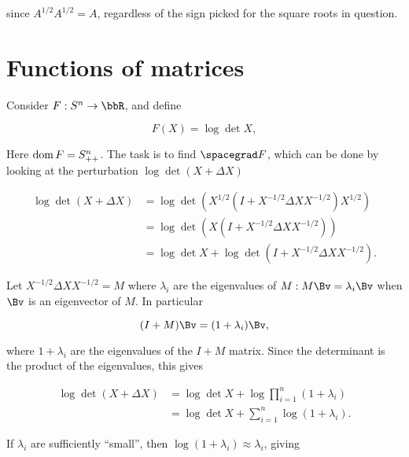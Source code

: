 since \( A^{1/2} A^{1/2} = A \), regardless of the sign picked for the square roots in question.

\section{Functions of matrices}

Consider \( F : S^n \rightarrow \bbR \), and define

\begin{dmath}\label{eqn:convexOptimizationLecture3:300}
F(X) = \log \det X,
\end{dmath}

Here \( \operatorname{dom} F = S^n_{++} \).
The task is to find \( \spacegrad F \), which can be done by looking at the perturbation
\( \log \det ( X + \Delta X ) \)

\begin{dmath}\label{eqn:convexOptimizationLecture3:320}
\begin{aligned}
\log \det ( X + \Delta X )
&=
\log \det ( X^{1/2} (I + X^{-1/2} \Delta X X^{-1/2}) X^{1/2} ) \\
&=
\log \det ( X (I + X^{-1/2} \Delta X X^{-1/2}) ) \\
&=
\log \det X  + \log \det (I + X^{-1/2} \Delta X X^{-1/2}).
\end{aligned}
\end{dmath}

Let \( X^{-1/2} \Delta X X^{-1/2} = M \) where \( \lambda_i \) are the eigenvalues of \( M : M \Bv = \lambda_i \Bv \) when \( \Bv \) is an eigenvector of \( M \).  In particular

\begin{dmath}\label{eqn:convexOptimizationLecture3:340}
(I + M) \Bv =
(1 + \lambda_i) \Bv,
\end{dmath}

where \( 1 + \lambda_i \) are the eigenvalues of the \( I + M \) matrix.  Since the determinant is the product of the eigenvalues, this gives

\begin{dmath}\label{eqn:convexOptimizationLecture3:360}
\begin{aligned}
\log \det ( X + \Delta X )
&=
\log \det X +
\log \prod_{i = 1}^n (1 + \lambda_i) \\
&=
\log \det X +
\sum_{i = 1}^n \log (1 + \lambda_i).
\end{aligned}
\end{dmath}

If \( \lambda_i \) are sufficiently ``small'', then \( \log ( 1 + \lambda_i ) \approx \lambda_i \), giving


